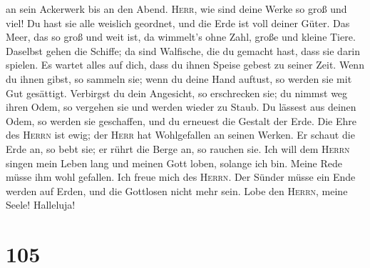 an sein Ackerwerk bis an den Abend.  \textsc{Herr}, wie
sind deine Werke so groß und viel! Du hast sie alle weislich geordnet,
und die Erde ist voll deiner Güter.  Das Meer, das so
groß und weit ist, da wimmelt's ohne Zahl, große und kleine Tiere.
 Daselbst gehen die Schiffe; da sind Walfische, die du
gemacht hast, dass sie darin spielen.  Es wartet alles
auf dich, dass du ihnen Speise gebest zu seiner Zeit. 
Wenn du ihnen gibst, so sammeln sie; wenn du deine Hand auftust, so
werden sie mit Gut gesättigt.  Verbirgst du dein
Angesicht, so erschrecken sie; du nimmst weg ihren Odem, so vergehen sie
und werden wieder zu Staub.  Du lässest aus deinen Odem,
so werden sie geschaffen, und du erneuest die Gestalt der Erde.
 Die Ehre des \textsc{Herrn} ist ewig; der \textsc{Herr}
hat Wohlgefallen an seinen Werken.  Er schaut die Erde
an, so bebt sie; er rührt die Berge an, so rauchen sie. 
Ich will dem \textsc{Herrn} singen mein Leben lang und meinen Gott
loben, solange ich bin.  Meine Rede müsse ihm wohl
gefallen. Ich freue mich des \textsc{Herrn}.  Der Sünder
müsse ein Ende werden auf Erden, und die Gottlosen nicht mehr sein. Lobe
den \textsc{Herrn}, meine Seele! Halleluja!

\hypertarget{section-104}{%
\section{105}\label{section-104}}

